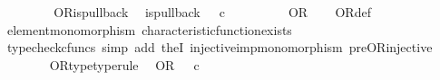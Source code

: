 \begin{isabellebody}
\ \ \ \ \isamarkupfalse%
\isanewline
\ \ \isamarkupfalse%
\isanewline
{}\isamarkupfalse%
%
\endisatagproof
{\isafoldproof}%
%
\isadelimproof
\isanewline
%
\endisadelimproof
\isanewline
{}\isamarkupfalse%
\ OR{\isacharunderscore}{\kern0pt}is{\isacharunderscore}{\kern0pt}pullback{\isacharcolon}{\kern0pt}\isanewline
\ \ {\isachardoublequoteopen}is{\isacharunderscore}{\kern0pt}pullback\ {\isacharparenleft}{\kern0pt}{\isasymone}{\isasymCoprod}{\isacharparenleft}{\kern0pt}{\isasymone}{\isasymCoprod}{\isasymone}{\isacharparenright}{\kern0pt}{\isacharparenright}{\kern0pt}\ {\isasymone}\ {\isacharparenleft}{\kern0pt}{\isasymOmega}{\isasymtimes}\isactrlsub c{\isasymOmega}{\isacharparenright}{\kern0pt}\ {\isasymOmega}\ {\isacharparenleft}{\kern0pt}{\isasymbeta}\isactrlbsub {\isacharparenleft}{\kern0pt}{\isasymone}{\isasymCoprod}{\isacharparenleft}{\kern0pt}{\isasymone}{\isasymCoprod}{\isasymone}{\isacharparenright}{\kern0pt}{\isacharparenright}{\kern0pt}\isactrlesub {\isacharparenright}{\kern0pt}\ {\isasymt}\ {\isacharparenleft}{\kern0pt}{\isasymlangle}{\isasymt}{\isacharcomma}{\kern0pt}\ {\isasymt}{\isasymrangle}{\isasymamalg}\ {\isacharparenleft}{\kern0pt}{\isasymlangle}{\isasymt}{\isacharcomma}{\kern0pt}\ {\isasymf}{\isasymrangle}\ {\isasymamalg}{\isasymlangle}{\isasymf}{\isacharcomma}{\kern0pt}\ {\isasymt}{\isasymrangle}{\isacharparenright}{\kern0pt}{\isacharparenright}{\kern0pt}\ OR{\isachardoublequoteclose}\isanewline
%
\isadelimproof
\ \ %
\endisadelimproof
%
\isatagproof
{}\isamarkupfalse%
\ OR{\isacharunderscore}{\kern0pt}def\isanewline
\ \ \isamarkupfalse%
\ element{\isacharunderscore}{\kern0pt}monomorphism\ characteristic{\isacharunderscore}{\kern0pt}function{\isacharunderscore}{\kern0pt}exists\isanewline
\ \ \isamarkupfalse%
\ {\isacharparenleft}{\kern0pt}typecheck{\isacharunderscore}{\kern0pt}cfuncs{\isacharcomma}{\kern0pt}\ simp\ add{\isacharcolon}{\kern0pt}\ the{}I{}\ injective{\isacharunderscore}{\kern0pt}imp{\isacharunderscore}{\kern0pt}monomorphism\ pre{\isacharunderscore}{\kern0pt}OR{\isacharunderscore}{\kern0pt}injective{\isacharparenright}{\kern0pt}%
\endisatagproof
{\isafoldproof}%
%
\isadelimproof
\isanewline
%
\endisadelimproof
\ \ \ \ \ \ \isanewline
{}\isamarkupfalse%
\ OR{\isacharunderscore}{\kern0pt}type{\isacharbrackleft}{\kern0pt}type{\isacharunderscore}{\kern0pt}rule{\isacharbrackright}{\kern0pt}{\isacharcolon}{\kern0pt}\isanewline
\ \ {\isachardoublequoteopen}OR\ {\isacharcolon}{\kern0pt}\ {\isasymOmega}\ {\isasymtimes}\isactrlsub c\ {\isasymOmega}\ {\isasymrightarrow}\ {\isasymOmega}{\isachardoublequoteclose}\isanewline

\end{isabellebody}
